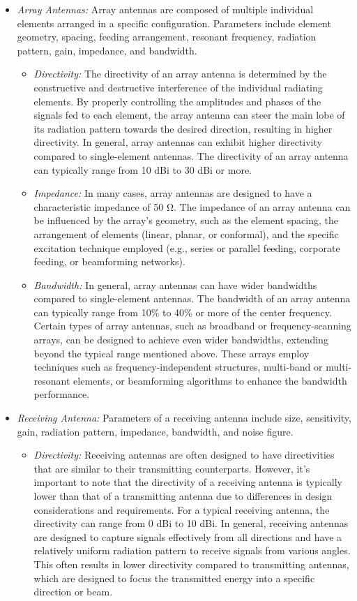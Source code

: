 \documentclass[11pt,a4paper]{article}
\renewcommand{\ohm}{{\mathrm{\Omega}}}
\begin{document}
\begin{itemize}
    \item \emph{Array Antennas:} Array antennas are composed of multiple individual elements arranged in a specific configuration. Parameters include element geometry, spacing, feeding arrangement, resonant frequency, radiation pattern, gain, impedance, and bandwidth.
    \begin{itemize}
        \item \emph{Directivity:} The directivity of an array antenna is determined by the constructive and destructive interference of the individual radiating elements. By properly controlling the amplitudes and phases of the signals fed to each element, the array antenna can steer the main lobe of its radiation pattern towards the desired direction, resulting in higher directivity. In general, array antennas can exhibit higher directivity compared to single-element antennas. The directivity of an array antenna can typically range from 10 dBi to 30 dBi or more.
        \item \emph{Impedance:} In many cases, array antennas are designed to have a characteristic impedance of 50 $\ohm$. The impedance of an array antenna can be influenced by the array's geometry, such as the element spacing, the arrangement of elements (linear, planar, or conformal), and the specific excitation technique employed (e.g., series or parallel feeding, corporate feeding, or beamforming networks).
        \item \emph{Bandwidth:} In general, array antennas can have wider bandwidths compared to single-element antennas. The bandwidth of an array antenna can typically range from 10\% to 40\% or more of the center frequency. Certain types of array antennas, such as broadband or frequency-scanning arrays, can be designed to achieve even wider bandwidths, extending beyond the typical range mentioned above. These arrays employ techniques such as frequency-independent structures, multi-band or multi-resonant elements, or beamforming algorithms to enhance the bandwidth performance.
    \end{itemize}
    
    \item \emph{Receiving Antenna:} Parameters of a receiving antenna include size, sensitivity, gain, radiation pattern, impedance, bandwidth, and noise figure.
    \begin{itemize}
        \item \emph{Directivity:} Receiving antennas are often designed to have directivities that are similar to their transmitting counterparts. However, it's important to note that the directivity of a receiving antenna is typically lower than that of a transmitting antenna due to differences in design considerations and requirements. For a typical receiving antenna, the directivity can range from 0 dBi to 10 dBi. In general, receiving antennas are designed to capture signals effectively from all directions and have a relatively uniform radiation pattern to receive signals from various angles. This often results in lower directivity compared to transmitting antennas, which are designed to focus the transmitted energy into a specific direction or beam.
    \end{itemize}
    

\end{itemize}
\end{document}
